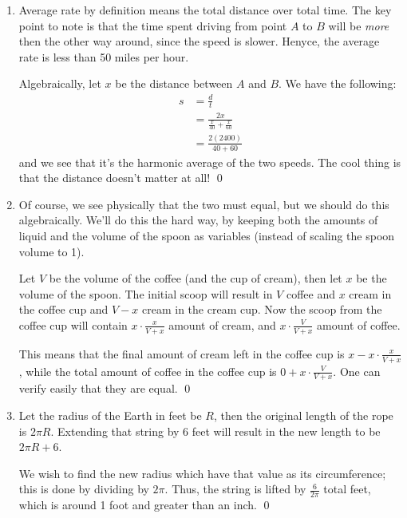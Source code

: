 \begin{Exercise}
	\begin{enumerate}
		\item Average rate by definition means the total distance over total time. 
		The key point to note is that the time spent driving from point $A$ to $B$ will be \emph{more} then the other way around, 
		since the speed is slower. 
		Henyce, the average rate is less than 50 miles per hour. 

		Algebraically, let $x$ be the distance between $A$ and $B$.
		We have the following:
		\begin{align}
			s &= \frac{d}{t} \\
			&= \frac{2x}{\frac{x}{40} + \frac{x}{60}} \\
			&= \frac{2(2400)}{40 + 60}
		\end{align}
		and we see that it's the harmonic average of the two speeds. 
		The cool thing is that the distance doesn't matter at all! \qed

		\item Of course, we see physically that the two must equal, but we should do this algebraically.
		We'll do this the hard way, by keeping both the amounts of liquid and the volume of the spoon as variables (instead of scaling the spoon volume to 1).

		Let $V$ be the volume of the coffee (and the cup of cream), then let $x$ be the volume of the spoon. 
		The initial scoop will result in $V$ coffee and $x$ cream in the coffee cup and $V-x$ cream in the cream cup.
		Now the scoop from the coffee cup will contain $x \cdot \frac{x}{V+x}$  amount of cream, and $x \cdot \frac{V}{V+x}$ amount of coffee.

		This means that the final amount of cream left in the coffee cup is $x - x\cdot \frac{x}{V+x}$, while the total amount of 
		coffee in the coffee cup is $0 + x\cdot \frac{V}{V+x}$. 
		One can verify easily that they are equal. \qed

		\item Let the radius of the Earth in feet be $R$, then the original length of the rope is $2\pi R$.
		Extending that string by 6 feet will result in the new length to be $2\pi R + 6$. 

		We wish to find the new radius which have that value as its circumference; this is done by dividing by $2\pi$.
		Thus, the string is lifted by $\frac{6}{2\pi}$ total feet, which is around 1 foot and greater than an inch. \qed
	\end{enumerate}
\end{Exercise}
